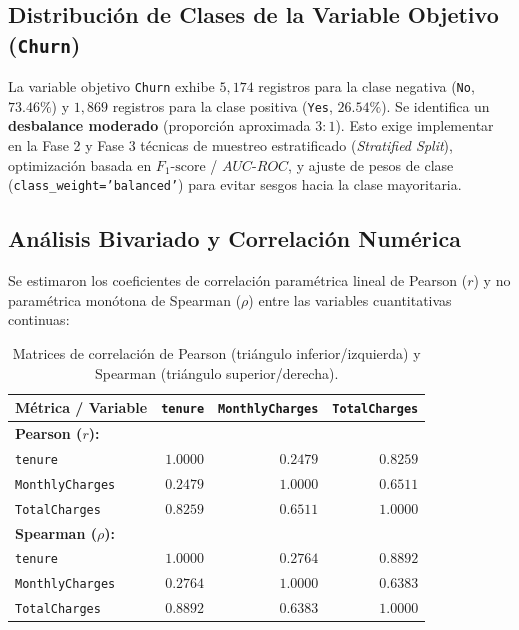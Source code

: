 \documentclass[11pt,letterpaper]{article}
\begin{document}
\subsection{Distribución de Clases de la Variable Objetivo (\texttt{Churn})}
La variable objetivo \texttt{Churn} exhibe $5,174$ registros para la clase negativa (\texttt{No}, $73.46\%$) y $1,869$ registros para la clase positiva (\texttt{Yes}, $26.54\%$). Se identifica un \textbf{desbalance moderado} (proporción aproximada $3:1$). Esto exige implementar en la Fase 2 y Fase 3 técnicas de muestreo estratificado (\textit{Stratified Split}), optimización basada en $F_1\text{-score}$ / $AUC\text{-}ROC$, y ajuste de pesos de clase (\texttt{class\_weight='balanced'}) para evitar sesgos hacia la clase mayoritaria.

\subsection{Análisis Bivariado y Correlación Numérica}
Se estimaron los coeficientes de correlación paramétrica lineal de Pearson ($r$) y no paramétrica monótona de Spearman ($\rho$) entre las variables cuantitativas continuas:

\begin{table}[H]
    \centering
    \small
    \caption{Matrices de correlación de Pearson (triángulo inferior/izquierda) y Spearman (triángulo superior/derecha).}
    \label{tab:correlaciones}
    \begin{tabular}{lrrr}
        \toprule
        \textbf{Métrica / Variable} & \textbf{\texttt{tenure}} & \textbf{\texttt{MonthlyCharges}} & \textbf{\texttt{TotalCharges}} \\
        \midrule
        \textbf{Pearson ($r$):} & & & \\
        \texttt{tenure} & $1.0000$ & $0.2479$ & $0.8259$ \\
        \texttt{MonthlyCharges} & $0.2479$ & $1.0000$ & $0.6511$ \\
        \texttt{TotalCharges} & $0.8259$ & $0.6511$ & $1.0000$ \\
        \midrule
        \textbf{Spearman ($\rho$):} & & & \\
        \texttt{tenure} & $1.0000$ & $0.2764$ & $0.8892$ \\
        \texttt{MonthlyCharges} & $0.2764$ & $1.0000$ & $0.6383$ \\
        \texttt{TotalCharges} & $0.8892$ & $0.6383$ & $1.0000$ \\
        \bottomrule
    \end{tabular}
\end{table}
\end{document}
